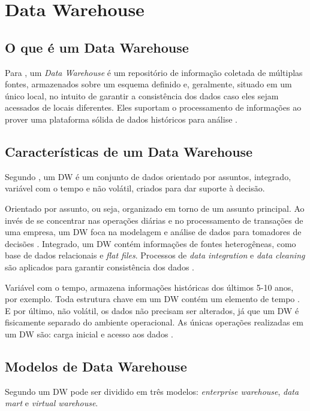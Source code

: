 \section{ Data Warehouse}
\subsection{O que é um Data Warehouse}
Para , um \textit{Data Warehouse} é um repositório de informação coletada de múltiplas fontes, armazenados sobre um esquema definido e, geralmente, situado em um único local, no intuito de garantir a consistência dos dados caso eles sejam acessados de locais diferentes. Eles suportam o processamento de informações ao prover uma plataforma sólida de dados históricos para análise \citep{jmj}.

\subsection{Características de um Data Warehouse}
Segundo , um DW é um conjunto de dados orientado por assuntos, integrado, variável com o tempo e não volátil, criados para dar suporte à decisão.

Orientado por assunto, ou seja, organizado em torno de um assunto principal. Ao invés de se concentrar nas operações diárias e no processamento de transações de uma empresa, um DW foca na modelagem e análise de dados para tomadores de decisões \citep{jmj}.
Integrado, um DW contém informações de fontes heterogêneas, como base de dados relacionais e \textit{flat files}. Processos de \textit{data integration} e \textit{data cleaning} são aplicados para garantir consistência dos dados \citep{jmj}.

Variável com o tempo, armazena informações históricas dos últimos 5-10 anos, por exemplo. Toda estrutura chave em um DW contém um elemento de tempo \citep{jmj}.
E por último, não volátil, os dados não precisam ser alterados, já que um DW é fisicamente separado do ambiente operacional. As únicas operações realizadas em um DW são: carga inicial e acesso aos dados \citep{jmj}.

\subsection{Modelos de Data Warehouse}
Segundo  um DW pode ser dividido em três modelos: \textit{enterprise warehouse}, \textit{data mart} e \textit{virtual warehouse}.

